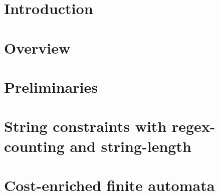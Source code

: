 \documentclass[preprint,12pt]{elsarticle}
\newcommand{\zhilin}[1]{\color{orange}\textbf{ZL:} #1 \textbf{:LZ}\color{black}}
\newcommand{\denghang}[1]{{\color{teal}\textbf{DH:} #1 \textbf{:HD}\color{black}}}
\begin{document}
\begin{frontmatter}




\end{frontmatter}


\section{Introduction} \label{sec:intro}


\section{Overview} \label{sec:overview}


\section{Preliminaries} \label{sec:pre}


\section{String constraints with regex-counting and string-length}\label{sec:recl}


\section{Cost-enriched finite automata} \label{sec:automaton}

\end{document}
